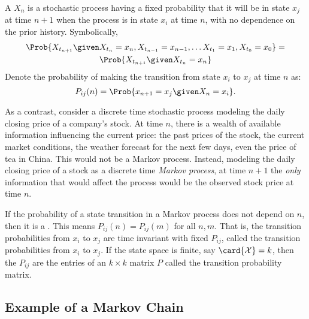 \documentclass[12pt]{article}
\begin{document}
\begin{definition}
    A  \( X_n \) is a stochastic
    process having a fixed probability that it will be in state \( x_j \)
    at time \( n+1 \) when the process is in state \( x_i \) at time \(
    n \), with no dependence on the prior history.%
    Symbolically,
    \begin{multline*}
        \Prob{X_{t_{n+1}} \given X_{t_{n}} = x_n, X_{t_{n-1}} = x_{n-1},
        \dots X_{t_1} = x_{1}, X_{t_0} = x_{0}} = \\
        \Prob{X_{t_{n+1}} \given X_{t_{n}} = x_{n}}
    \end{multline*}
    Denote the probability of making the transition from state \( x_i \)
    to \( x_j \) at time \( n \) as:
    \[
        P_{ij}(n)=\Prob{x_{n+1}=x_j \given X_n=x_i}.
    \]
\end{definition}

\begin{example}
    As a contrast, consider a discrete time stochastic process modeling
    the daily closing price of a company's stock.  At time \( n \),
    there is a wealth of available information influencing the current
    price:  the past prices of the stock, the current market conditions,
    the weather forecast for the next few days, even the price of tea in
    China.  This would not be a Markov process.
    Instead, modeling the daily closing price of a stock as a
    discrete time \emph{Markov process}, at time \( n + 1 \) the \emph{only}
    information that would affect the process would be the observed
    stock price at time \( n \).
\end{example}

\begin{definition}
    If the probability of a state transition in a Markov process does
    not depend on \( n \), then it is a .%
    This means \( P_{ij}(n)=P_{ij}(m) \) for all \( n,m \).  That is,
    the transition probabilities from \( x_i \) to \( x_j \) are time
    invariant with fixed \( P_{ij} \), called the transition
    probabilities from \( x_i \) to \( x_j \).  If the state space is
    finite, say \( \card{\mathcal{X}} = k \), then the \( P_{ij} \) are
    the entries of an \( k \times k \) matrix \( P \) called the
    transition probability matrix.
\end{definition}

\subsection*{Example of a Markov Chain}
\end{document}
